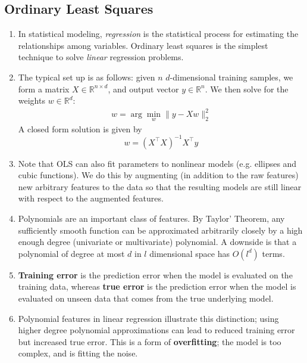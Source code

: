 \documentclass[10pt]{article}
\begin{document}
\begin{multicols}{2}
\begin{addmargin}[0.8em]{0.5em}
    \subsection{Ordinary Least Squares}
    \vspace{-0.2cm}
    \begin{enumerate}[label=(\alph*)]
        \item In statistical modeling, \textit{regression} is the statistical process for estimating the relationships among variables. Ordinary least squares is the simplest technique to solve \textit{linear} regression problems.
        \item The typical set up is as follows: given $n$ $d$-dimensional training samples, we form a matrix $X \in \mathbb{R}^{n \times d}$, and output vector $y \in \mathbb{R}^{n}$. We then solve for the weights $w \in \mathbb{R}^d$:
        \begin{align*}
        w = \arg\min_{w} \| y - X w \|_2^2
        \end{align*}
        A closed form solution is given by
        $$
        w = (X^\top X)^{-1} X^\top y
        $$
        \item Note that OLS can also fit parameters to nonlinear models (e.g. ellipses and cubic functions). We do this by augmenting (in addition to the raw features) new arbitrary features to the data so that the resulting models are still linear with respect to the augmented features.
        
        \item Polynomials are an important class of features. By Taylor’ Theorem, any sufficiently smooth function can be approximated arbitrarily closely by a high enough degree (univariate or multivariate) polynomial. A downside is that a polynomial of degree at most $d$ in $l$ dimensional space has $O(l^d)$ terms.
    
        \item \textbf{Training error} is the prediction error when the model is evaluated on the training data, whereas \textbf{true error} is the prediction error when the model is evaluated on unseen data that comes from the true underlying model. 
        \item Polynomial features in linear regression illustrate this distinction; using higher degree polynomial approximations can lead to reduced training error but increased true error. This is a form of \textbf{overfitting}; the model is too complex, and is fitting the noise. 
    \end{enumerate}
    

\end{addmargin}
\end{multicols}
\end{document}
